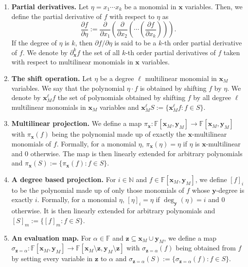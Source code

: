 \documentclass[10pt,a4paper]{article}
\begin{document}
\begin{enumerate}
\item \textbf{Partial derivatives.} Let $\eta=x_1\cdots x_k$ be a monomial in $\mathbf x$ variables. Then, we define the partial derivative of $f$ with respect to $\eta$ as
\[
\frac{\partial f}{\partial\eta}:=\frac{\partial}{\partial x_1}\left(\frac{\partial}{\partial x_2}\left(\cdots\left(\frac{\partial f}{\partial x_k}\right)\right)\right).
\]
If the degree of $\eta$ is $k$, then $\partial f/\partial\eta$ is said to be a $k$-th order partial derivative of $f$. We denote by $\partial_{\mathbf x}^kf$ the set of all $k$-th order partial derivatives of $f$ taken with respect to multilinear monomials in $\mathbf x$ variables.
\item \textbf{The shift operation.} Let $\eta$ be a degree $\ell$ multilinear monomial in $\mathbf x_M$ variables. We say that the polynomial $\eta\cdot f$ is obtained by shifting $f$ by $\eta$. We denote by $\mathbf x_M^\ell f$ the set of polynomials obtained by shifting $f$ by all degree $\ell$ multilinear monomials in $\mathbf x_M$ variables and $\mathbf x_M^\ell S:=\{\mathbf x_M^\ell f:f\in S\}$.
\item \textbf{Multilinear projection.} We define a map $\pi_{\mathbf x}:\mathbb F[\mathbf x_M,\mathbf y_M]\to\mathbb F[\mathbf x_M,\mathbf y_M]$ with $\pi_{\mathbf x}(f)$ being the polynomial made up of exactly the $\mathbf x$-multilinear monomials of $f$. Formally, for a monomial $\eta$, $\pi_{\mathbf x}(\eta)=\eta$ if $\eta$ is $\mathbf x$-multilinear and 0 otherwise. The map is then linearly extended for arbitrary polynomials and $\pi_{\mathbf x}(S):=\{\pi_{\mathbf x}(f):f\in S\}$.
\item \textbf{A degree based projection.} For $i\in\mathbb N$ and $f\in\mathbb F[\mathbf x_M,\mathbf y_M]$, we define $[f]_i$ to be the polynomial made up of only those monomials of $f$ whose $\mathbf y$-degree is exactly $i$. Formally, for a monomial $\eta$, $[\eta]_i=\eta$ if $\deg_{\mathbf y}(\eta)=i$ and 0 otherwise. It is then linearly extended for arbitrary polynomials and $[S]_m:=\{[f]_m:f\in S\}$.
\item \textbf{An evaluation map.} For $\alpha\in\mathbb F$ and $\mathbf z\subseteq\mathbf x_M\cup\mathbf y_M$, we define a map $\sigma_{\mathbf z=\alpha}:\mathbb F[\mathbf x_M,\mathbf y_M]\to\mathbb F[\mathbf x_M\setminus\mathbf z,\mathbf y_M\setminus\mathbf z]$ with $\sigma_{\mathbf z=\alpha}(f)$ being obtained from $f$ by setting every variable in $\mathbf z$ to $\alpha$ and $\sigma_{\mathbf z=\alpha}(S):=\{\sigma_{\mathbf z=\alpha}(f):f\in S\}$.
\end{enumerate}
\end{document}
